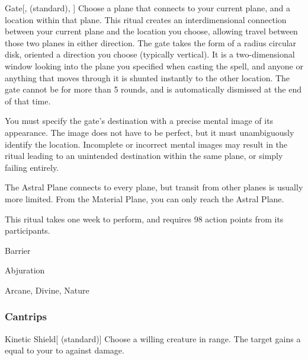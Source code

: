 \lowercase{\hypertarget{spell:Gate}{}}\label{spell:Gate}
\begin{apability}[\nth{7}]{\hypertarget{spell:Gate}{Gate}}[,  (standard), ]
Choose a plane that connects to your current plane, and a location within that plane.
This ritual creates an interdimensional connection between your current plane and the location you choose, allowing travel between those two planes in either direction.
The gate takes the form of a \areasmall radius circular disk, oriented a direction you choose (typically vertical).
It is a two-dimensional window looking into the plane you specified when casting the spell, and anyone or anything that moves through it is shunted instantly to the other location.
The gate cannot be  for more than 5 rounds, and is automatically dismissed at the end of that time.

You must specify the gate's destination with a precise mental image of its appearance.
The image does not have to be perfect, but it must unambiguously identify the location.
Incomplete or incorrect mental images may result in the ritual leading to an unintended destination within the same plane, or simply failing entirely.

The Astral Plane connects to every plane, but transit from other planes is usually more limited.
From the Material Plane, you can only reach the Astral Plane.

This ritual takes one week to perform, and requires 98 action points from its participants.
\end{apability}
\vspace{0.25em}


\newpage
\begin{spellsection}{Barrier}

\begin{spellheader}
\end{spellheader}


 Abjuration

 Arcane, Divine, Nature

\subsubsection{Cantrips}


\begin{freeability}{Kinetic Shield}[ (standard)]
Choose a willing creature in \rngclose range.
The target gains a  equal to your  to  against  damage.
\end{freeability}

\end{spellsection}


